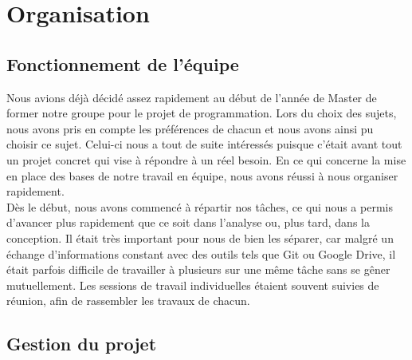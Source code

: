 ﻿\documentclass[16pts]{report}
\begin{document}

\nocite{*}

\chapter{Organisation}
\label{cha:Organisation}

\section{Fonctionnement de l'équipe}
\label{sec:Fonctionnement de l'équipe}

Nous avions déjà décidé assez rapidement au début de l'année de Master 
de former notre groupe pour le projet de programmation. Lors du choix 
des sujets, nous avons pris en compte les préférences de chacun et nous 
avons ainsi pu choisir ce sujet. Celui-ci nous a tout de suite intéressés 
puisque c'était avant tout un projet concret qui vise à répondre à un 
réel besoin.
En ce qui concerne la mise en place des bases de notre travail en 
équipe, nous avons réussi à nous organiser rapidement. 
\\
Dès le début, nous avons commencé à répartir nos tâches, ce qui nous a 
permis d’avancer plus rapidement que ce soit dans l’analyse ou, plus tard, 
dans la conception. Il était très important pour nous de bien les séparer, 
car malgré un échange d’informations constant avec des outils tels que 
Git ou Google Drive, il était parfois difficile de travailler à plusieurs 
sur une même tâche sans se gêner mutuellement. Les sessions de travail 
individuelles étaient souvent suivies de réunion, afin de rassembler 
les travaux de chacun.
\\


\section{Gestion du projet}
\label{sec:Gestion du projet}
\end{document}
